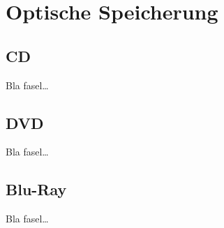     
    \section{Optische Speicherung}
    \label{ch:Technisch:sec:Optische Speicherung}
        \subsection{CD}
        \label{ch:Technisch:sec:Optische Speicherung:sub:CD}
        
            Bla fasel\ldots
        
        \subsection{DVD}
        \label{ch:Technisch:sec:Optische Speicherung:sub:DVD}
        
            Bla fasel\ldots
        
        \subsection{Blu-Ray}
        \label{ch:Technisch:sec:Optische Speicherung:sub:Blu-Ray}
        
            Bla fasel\ldots

